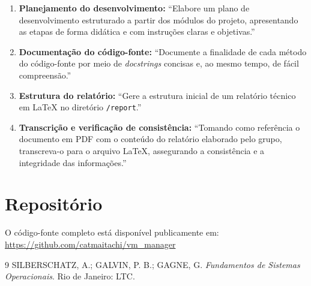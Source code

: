 \documentclass[11pt,a4paper]{article}
\begin{document}
\begin{enumerate}
    \item \textbf{Planejamento do desenvolvimento:} ``Elabore um plano de
          desenvolvimento estruturado a partir dos módulos do projeto,
          apresentando as etapas de forma didática e com instruções claras e
          objetivas.''
    \item \textbf{Documentação do código-fonte:} ``Documente a finalidade de
          cada método do código-fonte por meio de \textit{docstrings} concisas
          e, ao mesmo tempo, de fácil compreensão.''
    \item \textbf{Estrutura do relatório:} ``Gere a estrutura inicial de um
          relatório técnico em LaTeX no diretório \texttt{/report}.''
    \item \textbf{Transcrição e verificação de consistência:} ``Tomando como
          referência o documento em PDF com o conteúdo do relatório elaborado
          pelo grupo, transcreva-o para o arquivo LaTeX, assegurando a
          consistência e a integridade das informações.''
\end{enumerate}

\section*{Repositório}
O código-fonte completo está disponível publicamente em:\\
\url{https://github.com/catmaitachi/vm_manager}

\begin{thebibliography}{9}
 SILBERSCHATZ, A.; GALVIN, P. B.; GAGNE, G.
  \textit{Fundamentos de Sistemas Operacionais}. Rio de Janeiro: LTC.
\end{thebibliography}
\end{document}

